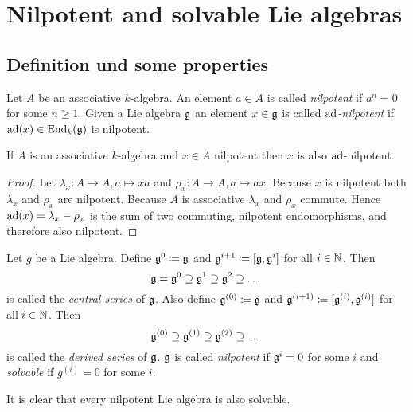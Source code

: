 \section{Nilpotent and solvable Lie algebras}





\subsection{Definition und some properties}


\begin{defi}
 Let $A$ be an associative $k$-algebra. An element $a \in A$ is called \emph{nilpotent} if $a^n = 0$ for some $n \geq 1$. Given a Lie algebra $\mathfrak{g}$ an element $x \in \mathfrak{g}$ is called \emph{$\operatorname{ad}$-nilpotent} if $\operatorname{ad}(x) \in \operatorname{End}_k(\mathfrak{g})$ is nilpotent.
\end{defi}


\begin{lem}\label{lem: nilpotent implies ad-nilpotent}
 If $A$ is an associative $k$-algebra and $x \in A$ nilpotent then $x$ is also $\operatorname{ad}$-nilpotent.
\end{lem}
\begin{proof}
 Let $\lambda_x \colon A \to A, a \mapsto xa$ and $\rho_x \colon A \to A, a \mapsto ax$. Because $x$ is nilpotent both $\lambda_x$ and $\rho_x$ are nilpotent. Because $A$ is associative $\lambda_x$ and $\rho_x$ commute. Hence $\operatorname{ad}(x) = \lambda_x - \rho_x$ is the sum of two commuting, nilpotent endomorphisms, and therefore also nilpotent.
\end{proof}


\begin{defi}
 Let $g$ be a Lie algebra. Define $\mathfrak{g}^0 \coloneqq \mathfrak{g}$ and $\mathfrak{g}^{i+1} \coloneqq [\mathfrak{g},\mathfrak{g}^i]$ for all $i \in \mathbb{N}$. Then
 \[
  \mathfrak{g} = \mathfrak{g}^0 \supseteq \mathfrak{g}^1 \supseteq \mathfrak{g}^2 \supseteq \dots
 \]
 is called the \emph{central series} of $\mathfrak{g}$. Also define $\mathfrak{g}^{(0)} \coloneqq \mathfrak{g}$ and $\mathfrak{g}^{(i+1)} \coloneqq [\mathfrak{g}^{(i)},\mathfrak{g}^{(i)}]$ for all $i \in \mathbb{N}$. Then
 \[
  \mathfrak{g}^{(0)} \supseteq \mathfrak{g}^{(1)} \supseteq \mathfrak{g}^{(2)} \supseteq \dots
 \]
 is called the \emph{derived series} of $\mathfrak{g}$. $\mathfrak{g}$ is called \emph{nilpotent} if $\mathfrak{g}^i = 0$ for some $i$ and \emph{solvable} if $g^{(i)} = 0$ for some $i$.
\end{defi}


It is clear that every nilpotent Lie algebra is also solvable.


